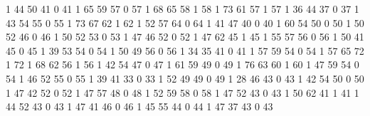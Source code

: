 \documentclass[a4paper,10pt]{article}
\begin{document}
\begin{eulernotebook}
\begin{eulercomment}
\begin{eulercomment}
\begin{eulercomment}
\begin{eulercomment}
\begin{eulercomment}
\begin{eulercomment}
\begin{eulercomment}
\begin{eulercomment}
\begin{euleroutput}
           1        44        50        41         0          41
           1        65        59        57         0          57
           1        68        65        58         1          58
           1        73        61        57         1          57
           1        36        44        37         0          37
           1        43        54        55         0          55
           1        73        67        62         1          62
           1        52        57        64         0          64
           1        41        47        40         0          40
           1        60        54        50         0          50
           1        50        52        46         0          46
           1        50        52        53         0          53
           1        47        46        52         0          52
           1        47        62        45         1          45
           1        55        57        56         0          56
           1        50        41        45         0          45
           1        39        53        54         0          54
           1        50        49        56         0          56
           1        34        35        41         0          41
           1        57        59        54         0          54
           1        57        65        72         1          72
           1        68        62        56         1          56
           1        42        54        47         0          47
           1        61        59        49         0          49
           1        76        63        60         1          60
           1        47        59        54         0          54
           1        46        52        55         0          55
           1        39        41        33         0          33
           1        52        49        49         0          49
           1        28        46        43         0          43
           1        42        54        50         0          50
           1        47        42        52         0          52
           1        47        57        48         0          48
           1        52        59        58         0          58
           1        47        52        43         0          43
           1        50        62        41         1          41
           1        44        52        43         0          43
           1        47        41        46         0          46
           1        45        55        44         0          44
           1        47        37        43         0          43

\end{euleroutput}
\end{eulercomment}
\end{eulercomment}
\end{eulercomment}
\end{eulercomment}
\end{eulercomment}
\end{eulercomment}
\end{eulercomment}
\end{eulercomment}
\end{eulernotebook}
\end{document}

